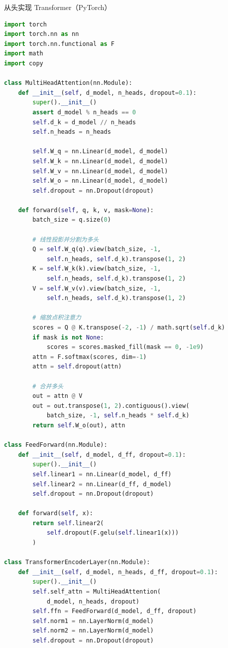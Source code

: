 \begin{mycode}{从头实现 Transformer（PyTorch）}
\begin{lstlisting}[language=Python]
import torch
import torch.nn as nn
import torch.nn.functional as F
import math
import copy

class MultiHeadAttention(nn.Module):
    def __init__(self, d_model, n_heads, dropout=0.1):
        super().__init__()
        assert d_model % n_heads == 0
        self.d_k = d_model // n_heads
        self.n_heads = n_heads

        self.W_q = nn.Linear(d_model, d_model)
        self.W_k = nn.Linear(d_model, d_model)
        self.W_v = nn.Linear(d_model, d_model)
        self.W_o = nn.Linear(d_model, d_model)
        self.dropout = nn.Dropout(dropout)

    def forward(self, q, k, v, mask=None):
        batch_size = q.size(0)

        # 线性投影并分割为多头
        Q = self.W_q(q).view(batch_size, -1,
            self.n_heads, self.d_k).transpose(1, 2)
        K = self.W_k(k).view(batch_size, -1,
            self.n_heads, self.d_k).transpose(1, 2)
        V = self.W_v(v).view(batch_size, -1,
            self.n_heads, self.d_k).transpose(1, 2)

        # 缩放点积注意力
        scores = Q @ K.transpose(-2, -1) / math.sqrt(self.d_k)
        if mask is not None:
            scores = scores.masked_fill(mask == 0, -1e9)
        attn = F.softmax(scores, dim=-1)
        attn = self.dropout(attn)

        # 合并多头
        out = attn @ V
        out = out.transpose(1, 2).contiguous().view(
            batch_size, -1, self.n_heads * self.d_k)
        return self.W_o(out), attn

class FeedForward(nn.Module):
    def __init__(self, d_model, d_ff, dropout=0.1):
        super().__init__()
        self.linear1 = nn.Linear(d_model, d_ff)
        self.linear2 = nn.Linear(d_ff, d_model)
        self.dropout = nn.Dropout(dropout)

    def forward(self, x):
        return self.linear2(
            self.dropout(F.gelu(self.linear1(x)))
        )

class TransformerEncoderLayer(nn.Module):
    def __init__(self, d_model, n_heads, d_ff, dropout=0.1):
        super().__init__()
        self.self_attn = MultiHeadAttention(
            d_model, n_heads, dropout)
        self.ffn = FeedForward(d_model, d_ff, dropout)
        self.norm1 = nn.LayerNorm(d_model)
        self.norm2 = nn.LayerNorm(d_model)
        self.dropout = nn.Dropout(dropout)


\end{lstlisting}
\end{mycode}

